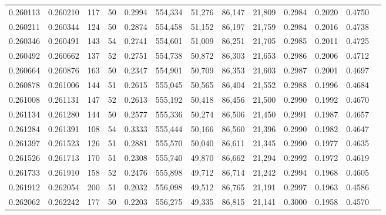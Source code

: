 \begin{tabular}{rrrrrrrrrrrrr}
0.260113 & 0.260210 &   117 &  50 &                                     0.2994 & 554,334 &  51,276 &  86,147 &  21,809 & 0.2984 & 0.2020 & 0.4750 \\
0.260211 & 0.260344 &   124 &  50 &                                     0.2874 & 554,458 &  51,152 &  86,197 &  21,759 & 0.2984 & 0.2016 & 0.4738 \\
0.260346 & 0.260491 &   143 &  54 &                                     0.2741 & 554,601 &  51,009 &  86,251 &  21,705 & 0.2985 & 0.2011 & 0.4725 \\
0.260492 & 0.260662 &   137 &  52 &                                     0.2751 & 554,738 &  50,872 &  86,303 &  21,653 & 0.2986 & 0.2006 & 0.4712 \\
0.260664 & 0.260876 &   163 &  50 &                                     0.2347 & 554,901 &  50,709 &  86,353 &  21,603 & 0.2987 & 0.2001 & 0.4697 \\
0.260878 & 0.261006 &   144 &  51 &                                     0.2615 & 555,045 &  50,565 &  86,404 &  21,552 & 0.2988 & 0.1996 & 0.4684 \\
0.261008 & 0.261131 &   147 &  52 &                                     0.2613 & 555,192 &  50,418 &  86,456 &  21,500 & 0.2990 & 0.1992 & 0.4670 \\
0.261134 & 0.261280 &   144 &  50 &                                     0.2577 & 555,336 &  50,274 &  86,506 &  21,450 & 0.2991 & 0.1987 & 0.4657 \\
0.261284 & 0.261391 &   108 &  54 &                                     0.3333 & 555,444 &  50,166 &  86,560 &  21,396 & 0.2990 & 0.1982 & 0.4647 \\
0.261397 & 0.261523 &   126 &  51 &                                     0.2881 & 555,570 &  50,040 &  86,611 &  21,345 & 0.2990 & 0.1977 & 0.4635 \\
0.261526 & 0.261713 &   170 &  51 &                                     0.2308 & 555,740 &  49,870 &  86,662 &  21,294 & 0.2992 & 0.1972 & 0.4619 \\
0.261733 & 0.261910 &   158 &  52 &                                     0.2476 & 555,898 &  49,712 &  86,714 &  21,242 & 0.2994 & 0.1968 & 0.4605 \\
0.261912 & 0.262054 &   200 &  51 &                                     0.2032 & 556,098 &  49,512 &  86,765 &  21,191 & 0.2997 & 0.1963 & 0.4586 \\
0.262062 & 0.262242 &   177 &  50 &                                     0.2203 & 556,275 &  49,335 &  86,815 &  21,141 & 0.3000 & 0.1958 & 0.4570 \\

\end{tabular}
